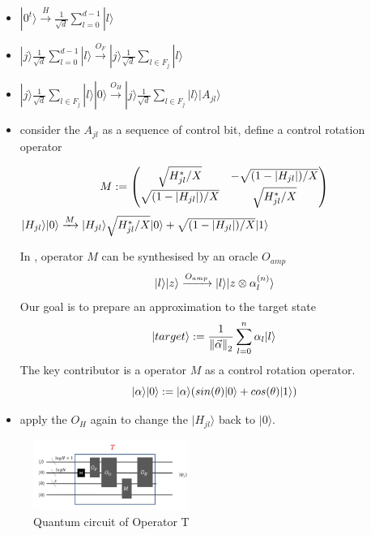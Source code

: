 \documentclass[%
 reprint,
 amsmath,amssymb,
pra,
]{revtex4-1}
\begin{document}
\begin{itemize}
\item $|0^t\rangle\xrightarrow{H}
\frac{1}{\sqrt{d}}\sum_{l=0}^{d-1}|l\rangle$
\item $|j\rangle\frac{1}{\sqrt{d}}\sum_{l=0}^{d-1}|l
\rangle\xrightarrow{O_F}|j\rangle\frac{1}{\sqrt{d}}\sum_{l\in F_j}|l
\rangle$
\item $|j\rangle\frac{1}{\sqrt{d}}\sum_{l\in F_j}|l\rangle|0\rangle
\xrightarrow{O_H}|j\rangle\frac{1}{\sqrt{d}}\sum_{l\in F_j}|l\rangle
|A_{jl}\rangle$
\item consider the $A_{jl}$ as a sequence of control bit, define a control 
rotation operator

\begin{equation}
M:=\begin{pmatrix}
\sqrt{H_{jl}^*/X} & -\sqrt{(1-|H_{jl}|)/X}\\
\sqrt{(1-|H_{jl}|)/X} &\sqrt{H_{jl}^*/X}\notag
\end{pmatrix}
\end{equation}
$|H_{jl}\rangle|0\rangle\xrightarrow{M}|H_{jl}\rangle
\sqrt{H_{jl}^*/X}|0\rangle+\sqrt{(1-|H_{jl}|)/X}|1\rangle\notag$

In \cite{PhysRevLett.122.020502}, operator $M$ can be synthesised by an oracle $O_{amp}$
\begin{equation}
|l\rangle|z\rangle\xrightarrow{O_{amp}}|l\rangle|z\otimes\alpha_l^{(n)}
\rangle\notag
\end{equation}
Our goal is to prepare an approximation to the target state
\begin{equation}
|target\rangle:=\frac{1}{{\lVert\vec{\alpha}\rVert}_2}\sum_{l=0}^n\alpha_l
|l\rangle\notag
\end{equation}
The key contributor is a operator $M$ as a control rotation operator.
\begin{equation}
|\alpha\rangle|0\rangle:=|\alpha\rangle(sin(\theta)|0\rangle+
cos(\theta)|1\rangle)\notag
\end{equation}

\item apply the $O_H$ again to change the $|H_{jl}\rangle$ back to 
$|0\rangle$.
\end{itemize}

\begin{figure}[h]
\centering
\includegraphics[width=0.45\textwidth]{Fig/T}
\caption{Quantum circuit of Operator T}
\label{T}
\end{figure}
\end{document}
